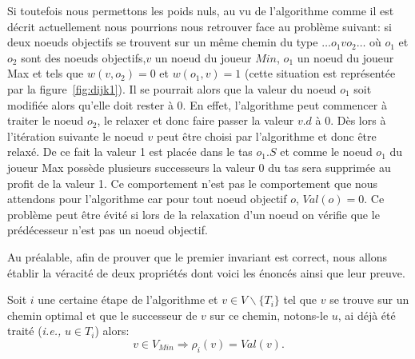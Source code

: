 Si toutefois nous permettons les poids nuls, au vu de l'algorithme comme il est décrit actuellement nous pourrions nous retrouver face au problème suivant: si deux noeuds objectifs se trouvent sur un même chemin du type $ \ldots o_1vo_2 \ldots$ où $o_1$ et $o_2$ sont des noeuds objectifs,$v$ un noeud du joueur $Min$, $o_1$ un noeud du joueur Max et tels que $w(v,o_2) = 0$ et $w(o_1,v) = 1$ (cette situation est représentée par la figure~\ref{fig:dijk1}). Il se pourrait alors que la valeur du noeud $o_1$ soit modifiée alors qu'elle doit rester à 0. En effet, l'algorithme peut commencer à traiter le noeud $o_2$, le relaxer et donc faire passer la valeur $v.d$ à 0. Dès lors à l'itération suivante le noeud $v$ peut être choisi par l'algorithme et donc être relaxé. De ce fait la valeur 1 est placée dans le tas $o_1.S$ et comme le noeud $o_1$ du joueur Max possède plusieurs successeurs la valeur 0 du tas sera supprimée au profit de la valeur 1. Ce comportement n'est pas le comportement que nous attendons pour l'algorithme car pour tout noeud objectif $o$, $Val(o) = 0$.
Ce problème peut être évité si lors de la relaxation d'un noeud on vérifie que le prédécesseur n'est pas un noeud objectif.



Au préalable, afin de prouver que le premier invariant est correct, nous allons établir la véracité de deux propriétés dont voici les énoncés ainsi que leur preuve.

\setcounter{equation}{0}

\begin{propriete}
	\label{prop:dijk1}
	Soit $i$ une certaine étape de l'algorithme et $v \in V\backslash \{ T_i \}$ tel que $v$ se trouve sur un chemin optimal et que le successeur de $v$ sur ce chemin, notons-le $u$, ai déjà été traité (\emph{i.e.,} $u \in T_i$) alors:
	$$ v \in V_{Min} \Rightarrow \rho_i(v) = Val(v).$$
\end{propriete}

